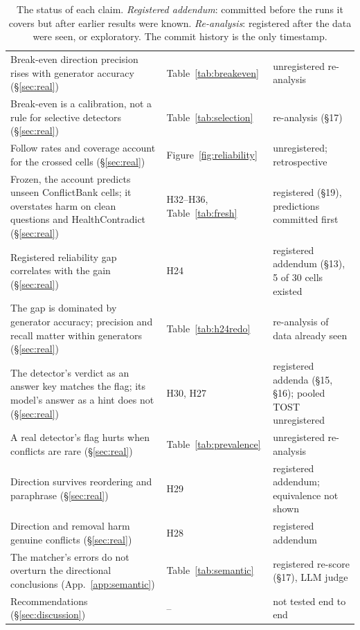 \begin{table}[t]
\begin{tabular}{p{7.4cm}p{3.6cm}p{4.2cm}}
Break-even direction precision rises with generator accuracy (\S\ref{sec:real}) & Table~\ref{tab:breakeven} & unregistered re-analysis \\
Break-even is a calibration, not a rule for selective detectors (\S\ref{sec:real}) & Table~\ref{tab:selection} & re-analysis (\S17) \\
Follow rates and coverage account for the crossed cells (\S\ref{sec:real}) & Figure~\ref{fig:reliability} & unregistered; retrospective \\
Frozen, the account predicts unseen ConflictBank cells; it overstates harm on clean questions and HealthContradict (\S\ref{sec:real}) & H32--H36, Table~\ref{tab:fresh} & registered (\S19), predictions committed first \\
Registered reliability gap correlates with the gain (\S\ref{sec:real}) & H24 & registered addendum (\S13), 5 of 30 cells existed \\
The gap is dominated by generator accuracy; precision and recall matter within generators (\S\ref{sec:real}) & Table~\ref{tab:h24redo} & re-analysis of data already seen \\
The detector's verdict as an answer key matches the flag; its model's answer as a hint does not (\S\ref{sec:real}) & H30, H27 & registered addenda (\S15, \S16); pooled TOST unregistered \\
A real detector's flag hurts when conflicts are rare (\S\ref{sec:real}) & Table~\ref{tab:prevalence} & unregistered re-analysis \\
Direction survives reordering and paraphrase (\S\ref{sec:real}) & H29 & registered addendum; equivalence not shown \\
Direction and removal harm genuine conflicts (\S\ref{sec:real}) & H28 & registered addendum \\
The matcher's errors do not overturn the directional conclusions (App.~\ref{app:semantic}) & Table~\ref{tab:semantic} & registered re-score (\S17), LLM judge \\
Recommendations (\S\ref{sec:discussion}) & -- & not tested end to end \\
\bottomrule
\end{tabular}
\caption{The status of each claim. \emph{Registered addendum}: committed before the runs it covers but
after earlier results were known. \emph{Re-analysis}: registered after the data were seen, or exploratory. The commit
history is the only timestamp.}
\label{tab:claims}
\end{table}

